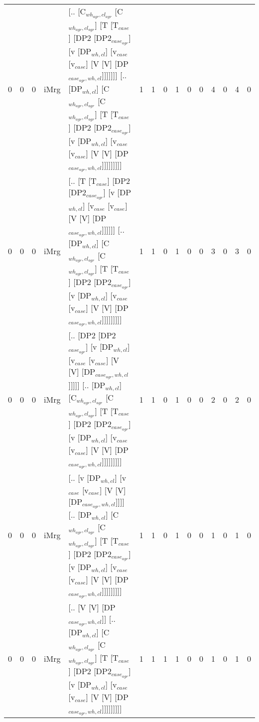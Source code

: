 \begin{tabularx}{\linewidth}{rrrlXrrrrrrrrrr}
   0 &       0 &   0 & iMrg & [.. [C$_{wh_{agr},cl_{agr}}$ [C$_{wh_{agr},cl_{agr}}$] [T [T$_{case}$] [DP2 [DP2$_{case_{agr}}$] [v [DP$_{wh,cl}$] [v$_{case}$ [v$_{case}$] [V [V] [DP$_{case_{agr},wh,cl}$]]]]]]] [.. [DP$_{wh,cl}$] [C$_{wh_{agr},cl_{agr}}$ [C$_{wh_{agr},cl_{agr}}$] [T [T$_{case}$] [DP2 [DP2$_{case_{agr}}$] [v [DP$_{wh,cl}$] [v$_{case}$ [v$_{case}$] [V [V] [DP$_{case_{agr},wh,cl}$]]]]]]]]] &             1 &             1 &                  0 &            1 &                0 &              0 &        4 &             0 &        4 &             0 \\
   0 &       0 &   0 & iMrg & [.. [T [T$_{case}$] [DP2 [DP2$_{case_{agr}}$] [v [DP$_{wh,cl}$] [v$_{case}$ [v$_{case}$] [V [V] [DP$_{case_{agr},wh,cl}$]]]]]] [.. [DP$_{wh,cl}$] [C$_{wh_{agr},cl_{agr}}$ [C$_{wh_{agr},cl_{agr}}$] [T [T$_{case}$] [DP2 [DP2$_{case_{agr}}$] [v [DP$_{wh,cl}$] [v$_{case}$ [v$_{case}$] [V [V] [DP$_{case_{agr},wh,cl}$]]]]]]]]]                                     &             1 &             1 &                  0 &            1 &                0 &              0 &        3 &             0 &        3 &             0 \\
   0 &       0 &   0 & iMrg & [.. [DP2 [DP2$_{case_{agr}}$] [v [DP$_{wh,cl}$] [v$_{case}$ [v$_{case}$] [V [V] [DP$_{case_{agr},wh,cl}$]]]]] [.. [DP$_{wh,cl}$] [C$_{wh_{agr},cl_{agr}}$ [C$_{wh_{agr},cl_{agr}}$] [T [T$_{case}$] [DP2 [DP2$_{case_{agr}}$] [v [DP$_{wh,cl}$] [v$_{case}$ [v$_{case}$] [V [V] [DP$_{case_{agr},wh,cl}$]]]]]]]]]                                                  &             1 &             1 &                  0 &            1 &                0 &              0 &        2 &             0 &        2 &             0 \\
   0 &       0 &   0 & iMrg & [.. [v [DP$_{wh,cl}$] [v$_{case}$ [v$_{case}$] [V [V] [DP$_{case_{agr},wh,cl}$]]]] [.. [DP$_{wh,cl}$] [C$_{wh_{agr},cl_{agr}}$ [C$_{wh_{agr},cl_{agr}}$] [T [T$_{case}$] [DP2 [DP2$_{case_{agr}}$] [v [DP$_{wh,cl}$] [v$_{case}$ [v$_{case}$] [V [V] [DP$_{case_{agr},wh,cl}$]]]]]]]]]                                                                       &             1 &             1 &                  0 &            1 &                0 &              0 &        1 &             0 &        1 &             0 \\
   0 &       0 &   0 & iMrg & [.. [V [V] [DP$_{case_{agr},wh,cl}$]] [.. [DP$_{wh,cl}$] [C$_{wh_{agr},cl_{agr}}$ [C$_{wh_{agr},cl_{agr}}$] [T [T$_{case}$] [DP2 [DP2$_{case_{agr}}$] [v [DP$_{wh,cl}$] [v$_{case}$ [v$_{case}$] [V [V] [DP$_{case_{agr},wh,cl}$]]]]]]]]]                                                                                                        &             1 &             1 &                  1 &            1 &                0 &              0 &        1 &             0 &        1 &             0 \\

\end{tabularx}
